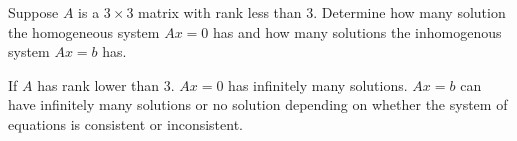 \documentclass{ximera}
\begin{document}
\begin{exercise} \label{YZ_3.4.2}
Suppose $A$ is a $3\times 3$ matrix with rank less than $3$. Determine how many solution the homogeneous system $Ax=0$ has and how many solutions the inhomogenous system $Ax=b$ has.


\begin{solution}
\ans
If $A$ has rank lower than $3$. $Ax=0$ has infinitely many solutions. $Ax=b$ can have infinitely many solutions or no solution depending on whether the system of equations is consistent or inconsistent.

\end{solution}
\end{exercise}
\end{document}
